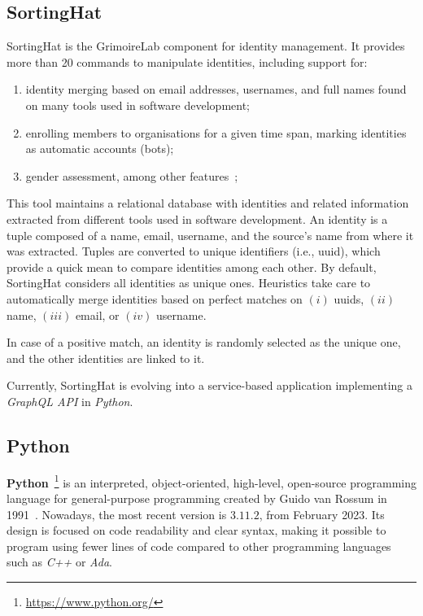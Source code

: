 \documentclass[a4paper, 12pt]{book}
\begin{document}
\subsection{SortingHat}
\label{sec:SortingHat}

SortingHat is the GrimoireLab component for identity management. It provides more than 20 commands to manipulate identities, including support for:

\begin{enumerate}[label=\roman*)]
    \item identity merging based on email addresses, usernames, and full names found on many tools used in software development;
    \item  enrolling members to organisations for a given time span, marking identities as automatic accounts (bots);
    \item gender assessment, among other features~\cite{moreno_et_al-sortinghat};
\end{enumerate}

This tool maintains a relational database with identities and related information extracted from different tools used in software development. An identity is a tuple composed of a name, email, username, and the source's name from where it was extracted. Tuples are converted to unique identifiers (i.e., uuid), which provide a quick mean to compare identities among each other. By default, SortingHat considers all identities as unique ones. Heuristics take care to automatically merge identities based on perfect matches on \((i)\) uuids, \((ii)\) name, \((iii)\) email, or \((iv)\) username.

In case of a positive match, an identity is randomly selected as the unique one, and the other identities are linked to it.

Currently, SortingHat is evolving into a service-based application implementing a \emph{GraphQL API} in \emph{Python}.

\subsection{Python}
\label{ssec:python}

\textbf{Python}~\footnote{\url{https://www.python.org/}} is an interpreted, object-oriented, high-level, open-source
programming language for general-purpose programming created by Guido van Rossum in 1991~\cite{van2007python}. Nowadays, the most
recent version is $3.11.2$, from February 2023. Its design is focused on code readability and clear syntax, making
it possible to program using fewer lines of code compared to other programming languages such as \emph{C++} or \emph{Ada}.
\end{document}
